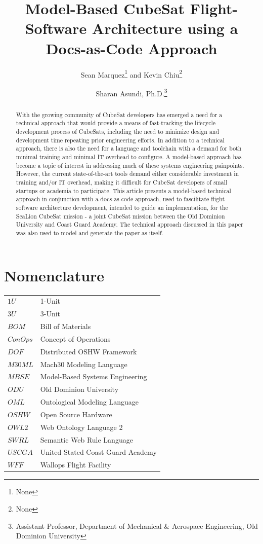 \documentclass[conf]{new-aiaa}
\title{Model-Based CubeSat Flight-Software Architecture using a Docs-as-Code Approach}
\author{Sean Marquez\footnote{None} and Kevin Chiu\footnote{None} }
\affil{Old Dominion University, Norfolk, VA, 23529}
\author{Sharan Asundi, Ph.D.\footnote{Assistant Professor, Department of Mechanical \& Aerospace Engineering, Old Dominion University} }
\affil{Old Dominion University, Norfolk, VA, 23529}
\begin{document}
\maketitle

\begin{abstract}
With the growing community of CubeSat developers has emerged a need for a technical approach that would provide a means of fast-tracking the lifecycle development process of CubeSats, including the need to minimize design and development time repeating prior engineering efforts. In addition to a technical approach, there is also the need for a language and toolchain with a demand for both minimal training and minimal IT overhead to configure. A model-based approach has become a topic of interest in addressing much of these systems engineering painpoints. However, the current state-of-the-art tools demand either considerable investment in training and/or IT overhead, making it difficult for CubeSat developers of small startups or academia to participate. This article presents a model-based technical approach in conjunction with a docs-as-code approach, used to fascilitate flight software architecture development, intended to guide an implementation, for the SeaLion CubeSat mission - a joint CubeSat mission between the Old Dominion University and Coast Guard Academy. The technical approach discussed in this paper was also used to model and generate the paper as itself.

\end{abstract}


\section{Nomenclature}

{\renewcommand\arraystretch{1.0}
\noindent\begin{longtable*}{@{}l @{\quad=\quad} l@{}}
$1U$ & 1-Unit \\
$3U$ & 3-Unit \\
$BOM$  & Bill of Materials \\
$ConOps$  & Concept of Operations \\
$DOF$  & Distributed OSHW Framework  \\
$M30ML$  & Mach30 Modeling Language \\
$MBSE$ & Model-Based Systems Engineering  \\
$ODU$ & Old Dominion University \\
$OML$  & Ontological Modeling Language \\
$OSHW$ & Open Source Hardware \\
$OWL2$ & Web Ontology Language 2 \\
$SWRL$ & Semantic Web Rule Language \\
$USCGA$ & United Stated Coast Guard Academy \\
$WFF$   & Wallops Flight Facility  
\end{longtable*}}
\end{document}

